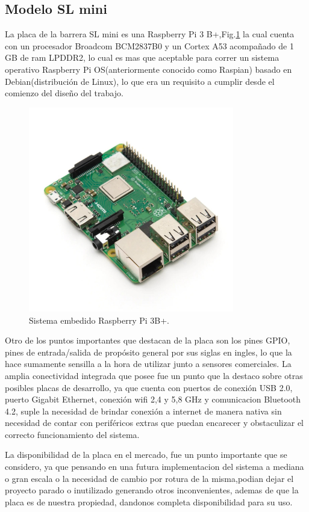 \subsection{Modelo SL mini}
La placa de la barrera SL mini es una Raspberry Pi 3 B+,Fig.\ref{fig:raspberry} la cual cuenta con un procesador 
Broadcom BCM2837B0 y un Cortex A53 acompañado de 1 GB de ram LPDDR2, lo cual es mas que aceptable para correr un sistema operativo Raspberry Pi 
OS(anteriormente conocido como Raspian) basado en Debian(distribución de Linux), lo que era un requisito a cumplir desde 
el comienzo del diseño del trabajo.
\begin{figure}
    \centering
    \includegraphics[width=0.8\textwidth]{imgs/Raspberry-pi3b+.jpg}
    \caption{Sistema embedido Raspberry Pi 3B+.}
    \label{fig:raspberry}
\end{figure}
Otro de los puntos importantes que destacan de la placa son los pines GPIO, pines de entrada/salida de propósito general 
por sus siglas en ingles, lo que la hace sumamente sensilla a la hora de utilizar junto a sensores comerciales.
La amplia conectividad integrada que posee fue un punto que la destaco sobre otras posibles placas de desarrollo, ya que 
cuenta con puertos de conexión USB 2.0, puerto Gigabit Ethernet, conexión wifi 2,4 y 5,8 GHz y comunicacion Bluetooth 4.2,
suple la necesidad de brindar conexión a internet de manera nativa sin necesidad de contar con periféricos extras que 
puedan encarecer y obstaculizar el correcto funcionamiento del sistema.

La disponibilidad de la placa en el mercado, fue un punto importante que se considero, ya que pensando en una futura 
implementacion del sistema a mediana o gran escala o la necesidad de cambio por rotura de la misma,podian dejar el 
proyecto parado o inutilizado generando otros inconvenientes, ademas de que la placa es de nuestra propiedad, dandonos
completa disponibilidad para su uso.
